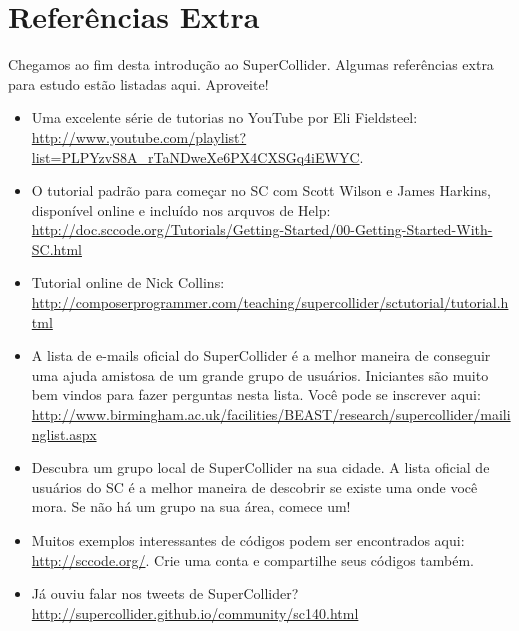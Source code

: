 \section{Referências Extra}

Chegamos ao fim desta introdução ao SuperCollider. Algumas referências extra para estudo estão listadas aqui. Aproveite!

\begin{itemize}
\item Uma excelente série de tutorias no YouTube por Eli Fieldsteel: \url{http://www.youtube.com/playlist?list=PLPYzvS8A_rTaNDweXe6PX4CXSGq4iEWYC}. 

\item O tutorial padrão para começar no SC com Scott Wilson e James Harkins, disponível online e incluído nos arquvos de Help:  
\url{http://doc.sccode.org/Tutorials/Getting-Started/00-Getting-Started-With-SC.html}

\item Tutorial online de Nick Collins: \url{http://composerprogrammer.com/teaching/supercollider/sctutorial/tutorial.html}
 
\item A lista de e-mails oficial do SuperCollider é a melhor maneira de conseguir uma ajuda amistosa de um grande grupo de usuários. Iniciantes são muito bem vindos para fazer perguntas nesta lista. Você pode se inscrever aqui: \url{http://www.birmingham.ac.uk/facilities/BEAST/research/supercollider/mailinglist.aspx}

\item Descubra um grupo local de SuperCollider na sua cidade. A lista oficial de usuários do SC é a melhor maneira de descobrir se existe uma onde você mora. Se não há um grupo na sua área, comece um!

\item Muitos exemplos interessantes de códigos podem ser encontrados aqui: \url{http://sccode.org/}. Crie uma conta e compartilhe seus códigos também.

\item Já ouviu falar nos tweets de SuperCollider? \url{http://supercollider.github.io/community/sc140.html}

\end{itemize}
